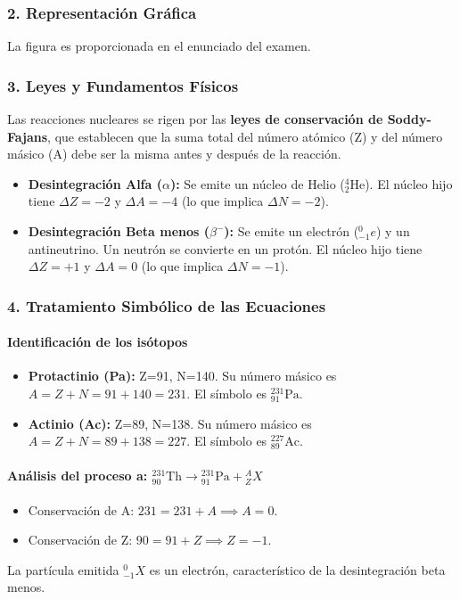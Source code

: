 \subsubsection*{2. Representación Gráfica}
La figura es proporcionada en el enunciado del examen.

\subsubsection*{3. Leyes y Fundamentos Físicos}
Las reacciones nucleares se rigen por las \textbf{leyes de conservación de Soddy-Fajans}, que establecen que la suma total del número atómico (Z) y del número másico (A) debe ser la misma antes y después de la reacción.
\begin{itemize}
    \item \textbf{Desintegración Alfa ($\alpha$):} Se emite un núcleo de Helio ($^{4}_{2}\text{He}$). El núcleo hijo tiene $\Delta Z = -2$ y $\Delta A = -4$ (lo que implica $\Delta N = -2$).
    \item \textbf{Desintegración Beta menos ($\beta^{-}$):} Se emite un electrón (${}^{0}_{-1}e$) y un antineutrino. Un neutrón se convierte en un protón. El núcleo hijo tiene $\Delta Z = +1$ y $\Delta A = 0$ (lo que implica $\Delta N = -1$).
\end{itemize}

\subsubsection*{4. Tratamiento Simbólico de las Ecuaciones}
\paragraph{Identificación de los isótopos}
\begin{itemize}
    \item \textbf{Protactinio (Pa):} Z=91, N=140. Su número másico es $A = Z+N = 91+140 = 231$. El símbolo es ${}^{231}_{91}\text{Pa}$.
    \item \textbf{Actinio (Ac):} Z=89, N=138. Su número másico es $A = Z+N = 89+138 = 227$. El símbolo es ${}^{227}_{89}\text{Ac}$.
\end{itemize}
\paragraph{Análisis del proceso a: ${}^{231}_{90}\text{Th} \rightarrow {}^{231}_{91}\text{Pa} + {}^{A}_{Z}X$}
\begin{itemize}
    \item Conservación de A: $231 = 231 + A \implies A=0$.
    \item Conservación de Z: $90 = 91 + Z \implies Z=-1$.
\end{itemize}
La partícula emitida ${}^{0}_{-1}X$ es un electrón, característico de la desintegración beta menos.

